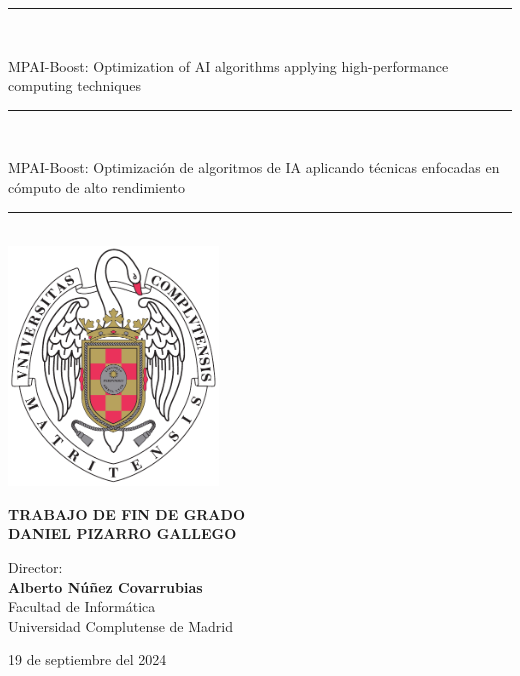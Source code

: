 \begin{titlepage}
	\thispagestyle{empty}
	
	\begin{center}
		
		\vspace{1cm}
		
		\vspace{0.65cm}
		\rule{2in}{0.5pt}\\
		\vspace{0.85cm}
		
		{\Large MPAI-Boost: Optimization of AI algorithms applying high-performance computing techniques}\\
		
		\vspace{0.65cm}
		\rule{2in}{0.5pt}\\
		\vspace{0.85cm}
		
		{\Large MPAI-Boost: Optimización de algoritmos de IA aplicando técnicas enfocadas en cómputo de alto rendimiento}\\
		
		\vspace{0.65cm}
		\rule{2in}{0.5pt}\\
		
		
		
		\vfill
		\includegraphics[height=2.5in]{images/escudo_ucm.pdf}
		\vfill
		
		
		
		\textbf{TRABAJO DE FIN DE GRADO}\\
		\vspace{0.7cm}
		\textbf{DANIEL PIZARRO GALLEGO}
		
		\vspace{1cm}
		
		Director:\\
		\textbf{Alberto Núñez Covarrubias}\\
		
		\vspace{1.8cm}
		Facultad de Informática\\
		Universidad Complutense de Madrid
		\vspace{0.5cm}
		
		19 de septiembre del 2024
		
		\vspace{0.2cm}
		
	\end{center}
\end{titlepage}